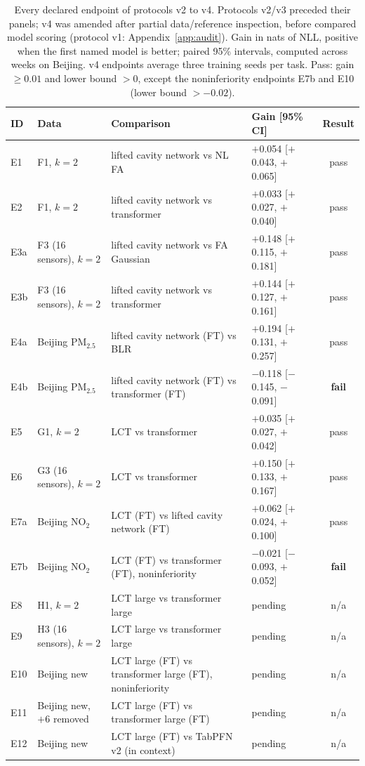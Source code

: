 \begin{table}[t]
\centering\footnotesize
\setlength{\tabcolsep}{3pt}
\caption{\label{tab:endpoints}Every declared endpoint of protocols v2 to v4. Protocols v2/v3 preceded their panels; v4 was amended after partial data/reference inspection, before compared model scoring (protocol v1: Appendix~\ref{app:audit}). Gain in nats of NLL, positive when the first named model is better; paired 95\% intervals, computed across weeks on Beijing. v4 endpoints average three training seeds per task. Pass: gain $\geq0.01$ and lower bound $>0$, except the noninferiority endpoints E7b and E10 (lower bound $>-0.02$).}
\begin{tabular}{llllc}
\toprule
ID & Data & Comparison & Gain [95\% CI] & Result\\
\midrule
E1 & F1, $k=2$ & lifted cavity network vs NL FA & $+$0.054 [$+$0.043, $+$0.065] & pass\\
E2 & F1, $k=2$ & lifted cavity network vs transformer & $+$0.033 [$+$0.027, $+$0.040] & pass\\
E3a & F3 (16 sensors), $k=2$ & lifted cavity network vs FA Gaussian & $+$0.148 [$+$0.115, $+$0.181] & pass\\
E3b & F3 (16 sensors), $k=2$ & lifted cavity network vs transformer & $+$0.144 [$+$0.127, $+$0.161] & pass\\
E4a & Beijing PM$_{2.5}$ & lifted cavity network (FT) vs BLR & $+$0.194 [$+$0.131, $+$0.257] & pass\\
E4b & Beijing PM$_{2.5}$ & lifted cavity network (FT) vs transformer (FT) & $-$0.118 [$-$0.145, $-$0.091] & \textbf{fail}\\
\midrule
E5 & G1, $k=2$ & LCT vs transformer & $+$0.035 [$+$0.027, $+$0.042] & pass\\
E6 & G3 (16 sensors), $k=2$ & LCT vs transformer & $+$0.150 [$+$0.133, $+$0.167] & pass\\
E7a & Beijing NO$_2$ & LCT (FT) vs lifted cavity network (FT) & $+$0.062 [$+$0.024, $+$0.100] & pass\\
E7b & Beijing NO$_2$ & LCT (FT) vs transformer (FT), noninferiority & $-$0.021 [$-$0.093, $+$0.052] & \textbf{fail}\\
\midrule
E8 & H1, $k=2$ & LCT large vs transformer large & pending & n/a\\
E9 & H3 (16 sensors), $k=2$ & LCT large vs transformer large & pending & n/a\\
E10 & Beijing new & LCT large (FT) vs transformer large (FT), noninferiority & pending & n/a\\
E11 & Beijing new, $+6$ removed & LCT large (FT) vs transformer large (FT) & pending & n/a\\
E12 & Beijing new & LCT large (FT) vs TabPFN v2 (in context) & pending & n/a\\
\bottomrule
\end{tabular}
\end{table}
